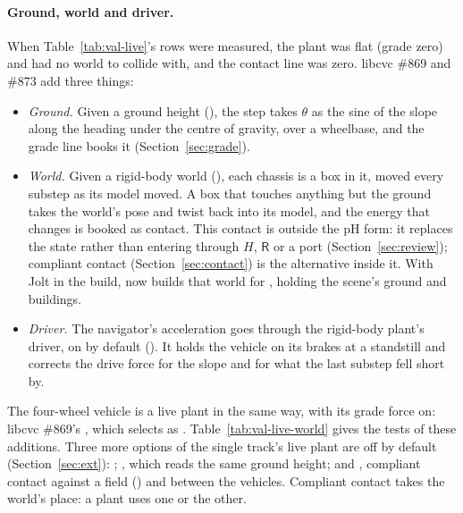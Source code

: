 \documentclass[11pt]{article}
\theoremstyle{remark}
\newcommand{\R}{\mathsf R}
\begin{document}
\paragraph{Ground, world and driver.} When Table~\ref{tab:val-live}'s rows were measured, the plant
was flat (grade zero) and had no world to collide with, and the contact line was zero. libcvc
\#869 and \#873 add three things:
\begin{itemize}
  \item \emph{Ground.} Given a ground height (), the step takes $\theta$
        as the sine of the slope along the heading under the centre of gravity, over a wheelbase,
        and the grade line books it (Section~\ref{sec:grade}).
  \item \emph{World.} Given a rigid-body world (), each
        chassis is a box in it, moved every substep as its model moved. A box that touches
        anything but the ground takes the world's pose and twist back into its model, and the
        energy that changes is booked as contact. This contact is outside the pH form: it
        replaces the state rather than entering through $H$, $\R$ or a port
        (Section~\ref{sec:review}); compliant contact (Section~\ref{sec:contact}) is the
        alternative inside it. With Jolt in the build,  now builds that world
        for , holding the scene's ground and buildings.
  \item \emph{Driver.} The navigator's acceleration goes through the rigid-body plant's driver,
        on by default (). It holds the vehicle on its
        brakes at a standstill and corrects the drive force for the slope and for what the last
        substep fell short by.
\end{itemize}
The four-wheel vehicle is a live plant in the same way, with its grade force on: libcvc \#869's
, which  selects as .
Table~\ref{tab:val-live-world} gives the tests of these additions. Three more options of the single
track's live plant are off by default (Section~\ref{sec:ext}): ;
, which reads the same ground height; and , compliant contact
against a field () and between the vehicles. Compliant contact takes the
world's place: a plant uses one or the other.

\end{document}
